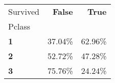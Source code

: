 \begin{tabular}{lrr}
\toprule
Survived & \textbf{False} & \textbf{True} \\
Pclass &  &  \\
\midrule
\textbf{1} & 37.04\% & 62.96\% \\
\textbf{2} & 52.72\% & 47.28\% \\
\textbf{3} & 75.76\% & 24.24\% \\
\bottomrule
\end{tabular}
